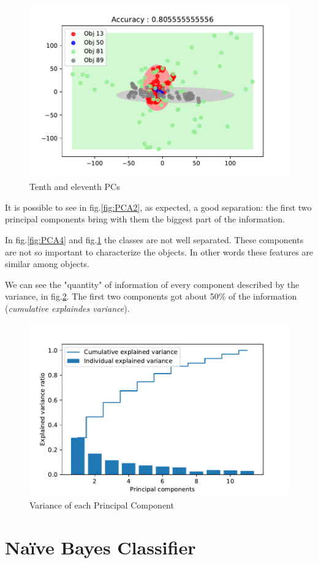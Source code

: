 \documentclass[10pt,a4paper]{article}
\begin{document}
	\begin{figure}[ph]
	\centering
	\includegraphics[width=0.7\linewidth]{../HW1/PCA11}
	\caption{Tenth and eleventh PCs}
	\label{fig:PCA11}
	\end{figure}
	
	It is possible to see in fig.\ref{fig:PCA2}, as expected, a good separation: the first two principal components bring with them the biggest part of the information.
	
	In fig.\ref{fig:PCA4} and fig.\ref{fig:PCA11} the classes are not well separated. These components are not so important to characterize the objects. In other words these features are similar among objects.
	
	We can see the "quantity" of information of every component described by the variance, in fig.\ref{fig:components}. The first two components got about 50\% of the information (\emph{cumulative explaindes variance}).
	
	\begin{figure}[ph]
	\centering
	\includegraphics[width=0.7\linewidth]{../HW1/components}
	\caption{Variance of each Principal Component}
	\label{fig:components}
	\end{figure}

	\newpage
	
	\section{Na\"ive Bayes Classifier}
	
\end{document}
